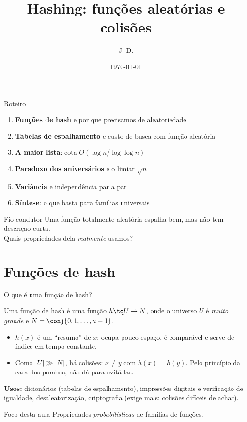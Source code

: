 \documentclass[aspectratio=169,11pt]{beamer}
\title[Hashing]{Hashing: funções aleatórias e colisões}
\author{J. D.}
\institute{UFABC}
\date{\today}
\begin{document}
\begin{frame}
  \titlepage
\end{frame}

\begin{frame}{Roteiro }
  \begin{enumerate}
  \item[1.] \textbf{Funções de hash} e por que precisamos de aleatoriedade 
  \item[2.] \textbf{Tabelas de espalhamento} e custo de busca com função aleatória 
  \item[3.] \textbf{A maior lista}: cota $O(\log n/\log\log n)$
  \item[4.] \textbf{Paradoxo dos aniversários} e o limiar $\sqrt n$ 
  \item[5.] \textbf{Variância} e independência par a par 
  \item[6.] \textbf{Síntese}: o que basta para famílias universais
  \end{enumerate}
  \vspace{1em}
  \begin{alertblock}{Fio condutor}
    Uma função totalmente aleatória espalha bem, mas não tem descrição curta. \\
    Quais propriedades dela \emph{realmente} usamos?
  \end{alertblock}
\end{frame}

\section{Funções de hash}

\begin{frame}{O que é uma função de hash?}
  \begin{definition}
    Uma \alert{função de hash} é uma função $h\tq U\to N$, onde o universo $U$
    é \emph{muito grande} e $N=\conj{0,1,\dots,n-1}$.
  \end{definition}
  \begin{itemize}
  \item $h(x)$ é um ``resumo'' de $x$: ocupa pouco espaço, é comparável e
    serve de índice em tempo constante.
  \item Como $\lvert U\rvert\gg\lvert N\rvert$, há \alert{colisões}: $x\neq y$ com
    $h(x)=h(y)$. Pelo princípio da casa dos pombos, não dá para evitá-las.
  \end{itemize}
  \pause
  \vspace{0.5em}
  \textbf{Usos:} dicionários (tabelas de espalhamento), impressões digitais e
  verificação de igualdade, desaleatorização, criptografia (exige mais:
  colisões difíceis de achar).
  \begin{block}{Foco desta aula}
    Propriedades \emph{probabilísticas} de famílias de funções.
  \end{block}
\end{frame}
\end{document}
